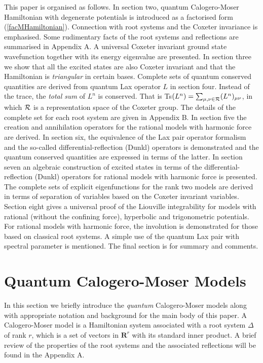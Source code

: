 \documentclass[a4paper,12pt]{article}
\begin{document}
This paper is organised as follows. In section two, quantum Calogero-Moser
Hamiltonian with degenerate potentials is introduced as a
factorised form (\ref{facMHamiltonian}). Connection with root systems and
the Coxeter invariance is emphasised.
Some rudimentary facts of the root systems and reflections are summarised
in Appendix A. A universal Coxeter invariant ground state wavefunction
together with its energy eigenvalue are presented.
In section three we show that all the excited states are also Coxeter
invariant and that the Hamiltonian is {\em triangular} in certain bases.
Complete sets of quantum conserved quantities are
derived from quantum Lax operator \(L\) in section four.
Instead of the trace, the {\em total sum\/} of \(L^n\) is conserved.
That is Ts\((L^n)=\sum_{\mu,\nu\in{\cal R}}(L^n)_{\mu\nu}\), in which
\({\cal R}\) is a representation space of the Coxeter group.
The details of the
complete set for each root system are given in Appendix B.
In section five the creation and annihilation operators for the rational
models with harmonic force are derived.
In section six, the equivalence of the Lax pair operator formalism and
the so-called differential-reflection (Dunkl) operators is demonstrated
and the quantum conserved quantities are expressed in terms of the latter.
In section seven an algebraic construction of excited states
in terms of the differential-reflection (Dunkl) operators for rational
models with harmonic force is presented.
The complete sets of explicit eigenfunctions for the rank two models
are derived in terms of separation of variables based on the Coxeter
invariant variables.
Section eight gives a universal proof of the Liouville integrability for
models with rational (without the confining force), hyperbolic and
trigonometric potentials.
For rational models with harmonic force, the involution is demonstrated
for those based on classical root systems.
A simple use of the quantum Lax pair with spectral parameter is mentioned.
The final section is for summary and comments.



\section{Quantum Calogero-Moser Models}
\label{cal-mo}
\setcounter{equation}{0}
In this section we briefly introduce the {\em quantum\/} Calogero-Moser
models along with
appropriate notation and background for the main body of this paper.
A   Calogero-Moser model is a
Hamiltonian system associated with a root system \(\Delta\)
of rank \(r\),
which is a set of
vectors in \(\mathbf{R}^{r}\) with its standard inner product.
A brief review of the properties of the root
systems and the associated reflections
will be found in the Appendix A.
\end{document}
